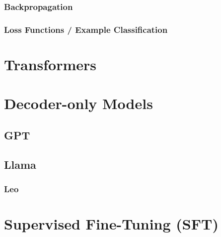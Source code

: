 %
%
%
%

%

\subsubsection{Backpropagation}

\subsubsection{Loss Functions / Example Classification}


\section{Transformers}\label{sec:trans}


\section{Decoder-only Models}\label{sec:decoder}

\subsection{GPT}\label{subsec:gpt}

\subsection{Llama}\label{subsec:llama}

\subsubsection{Leo}


\section{Supervised Fine-Tuning (SFT)}\label{sec:supervised-fine-tuning}


